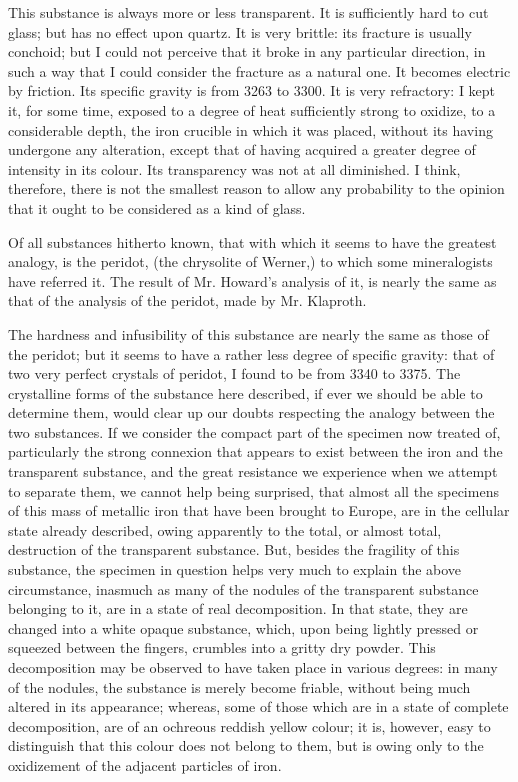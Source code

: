 \documentclass[a4paper, 12pt, oneside, twocolumn]{article}
\begin{document}
This substance is always more or less transparent. It is sufficiently hard to cut glass; but has no effect upon quartz. It is very brittle: its fracture is usually conchoid; but I could not perceive that it broke in any particular direction, in such a way that I could consider the fracture as a natural one. It becomes electric by friction. Its specific gravity is from 3263 to 3300. It is very refractory: I kept it, for some time, exposed to a degree of heat sufficiently strong to oxidize, to a considerable depth, the iron crucible in which it was placed, without its having undergone any alteration, except that of having acquired a greater degree of intensity in its colour. Its transparency was not at all diminished. I think, therefore, there is not the smallest reason to allow any probability to the opinion that it ought to be considered as a kind of glass.

Of all substances hitherto known, that with which it seems to have the greatest analogy, is the peridot, (the chrysolite of Werner,) to which some mineralogists have referred it. The result of Mr. Howard's analysis of it, is nearly the same as that of the analysis of the peridot, made by Mr. Klaproth.

The hardness and infusibility of this substance are nearly the same as those of the peridot; but it seems to have a rather less degree of specific gravity: that of two very perfect crystals of peridot, I found to be from 3340 to 3375. The crystalline forms of the substance here described, if ever we should be able to determine them, would clear up our doubts respecting the analogy between the two substances. If we consider the compact part of the specimen now treated of, particularly the strong connexion that appears to exist between the iron and the transparent substance, and the great resistance we experience when we attempt to separate them, we cannot help being surprised, that almost all the specimens of this mass of metallic iron that have been brought to Europe, are in the cellular state already described, owing apparently to the total, or almost total, destruction of the transparent substance. But, besides the fragility of this substance, the specimen in question helps very much to explain the above circumstance, inasmuch as many of the nodules of the transparent substance belonging to it, are in a state of real decomposition. In that state, they are changed into a white opaque substance, which, upon being lightly pressed or squeezed between the fingers, crumbles into a gritty dry powder. This decomposition may be observed to have taken place in various degrees: in many of the nodules, the substance is merely become friable, without being much altered in its appearance; whereas, some of those which are in a state of complete decomposition, are of an ochreous reddish yellow colour; it is, however, easy to distinguish that this colour does not belong to them, but is owing only to the oxidizement of the adjacent particles of iron.
\end{document}
